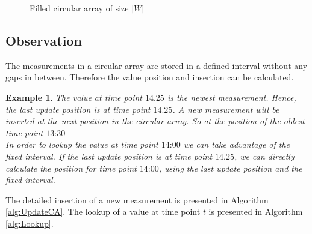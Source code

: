 \documentclass[abstracton,12pt]{scrreprt}
\newtheorem{example}{Example}
\begin{document}
\begin{enumerate}
\begin{figure}[H]
		\vspace{2mm}
		\caption{Filled circular array of size $|W|$}
		\label{fig:cat}
	\end{figure}
\end{enumerate}

\subsection{Observation}
The measurements in a circular array are stored in a defined interval without any gaps in between. Therefore the value position and insertion can be calculated.
\begin{example}
The value at time point $\text{14.25}$ is the newest measurement. Hence, the last update position is at time point $\text{14.25}$. A new measurement will be inserted at the next position in the circular array. So at the position of the oldest time point $\text{13:30}$\\
In order to lookup the value at time point $\text{14:00}$ we can take advantage of the fixed interval. If the last update position is at time point $\text{14.25}$, we can directly calculate the position for time point $\text{14:00}$, using the last update position and the fixed interval.
\end{example} 
The detailed insertion of a new measurement is presented in Algorithm \ref{alg:UpdateCA}. The lookup of a value at time point $t$ is presented in Algorithm \ref{alg:Lookup}.
\end{document}
